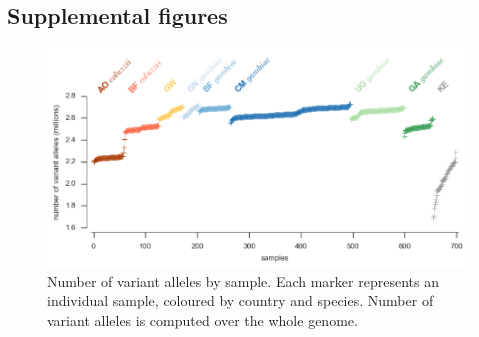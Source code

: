 \begin{refsection}
\section{Supplemental figures}\label{sec:ch3-supplemental-figures}


\begin{figure}[h]
\centering
\includegraphics[width=1\textwidth,center]{artwork/chapter3/sample_variant_count.pdf}
\caption{Number of variant alleles by sample.
%
Each marker represents an individual sample, coloured by country and species.
%
Number of variant alleles is computed over the whole genome.
}
%
\label{fig:ch3-sample_variant_count}
\end{figure}



\end{refsection}
